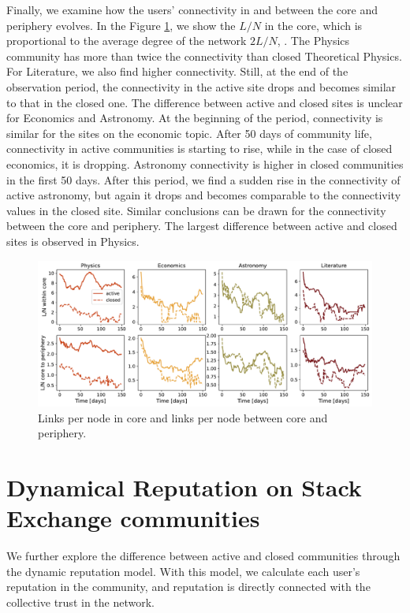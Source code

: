 Finally, we examine how the users’ connectivity in and between the core and periphery evolves. In the Figure \ref{fig:links_per_node}, we show the $L/N$ in the core, which is proportional to the average degree of the network $2L/N$, . The Physics community has more than twice the connectivity than closed Theoretical Physics. For Literature, we also find higher connectivity. Still, at the end of the observation period, the connectivity in the active site drops and becomes similar to that in the closed one. The difference between active and closed sites is unclear for Economics and Astronomy. At the beginning of the period, connectivity is similar for the sites on the economic topic. After 50 days of community life, connectivity in active communities is starting to rise, while in the case of closed economics, it is dropping. Astronomy connectivity is higher in closed communities in the first 50 days. After this period, we find a sudden rise in the connectivity of active astronomy, but again it drops and becomes comparable to the connectivity values in the closed site. Similar conclusions can be drawn for the connectivity between the core and periphery. The largest difference between active and closed sites is observed in Physics.  

\begin{figure}[h]
	\centering
	\includegraphics[width=\linewidth]{figures/stackexchange/core_connectivity.pdf}
	\caption{Links per node in core and links per node between core and periphery.}
	\label{fig:links_per_node}
\end{figure}

\section{Dynamical Reputation on Stack Exchange communities}

We further explore the difference between active and closed communities through the dynamic reputation model. With this model, we calculate each user's reputation in the community, and reputation is directly connected with the collective trust in the network. 

